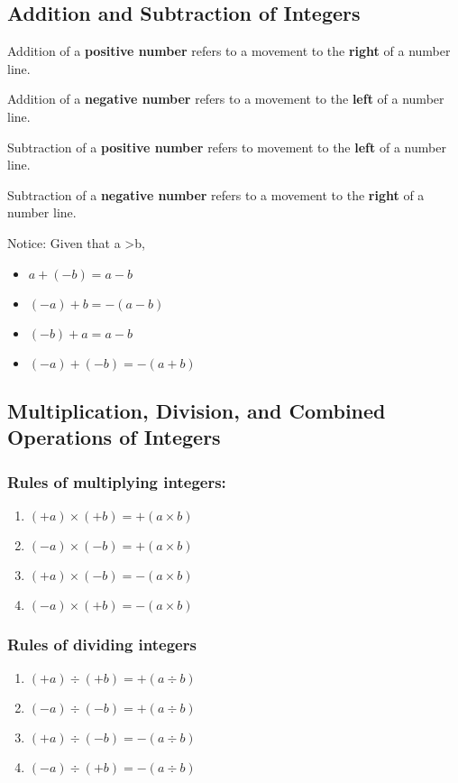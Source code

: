 \documentclass[../main]{subfiles}
\begin{document}
\subsection{Addition and Subtraction of Integers}

Addition of a \textbf{positive number} refers to a movement to the \textbf{right} of a
number line.

Addition of a \textbf{negative number} refers to a movement to the \textbf{left}
of a number line.

Subtraction of a \textbf{positive number} refers to movement to the
\textbf{left} of a number line.

Subtraction of a \textbf{negative number} refers to a movement to the
\textbf{right} of a number line.

Notice: Given that a \textgreater b,
\begin{itemize}
\item \(a + (-b) = a - b \)
\item \((-a) +b = -(a - b)\)
\item \((-b)+ a = a -b\)
\item \((-a)+(-b)= -(a+b)\)
\end{itemize}

\subsection{Multiplication, Division, and Combined Operations of Integers}
\subsubsection{Rules of multiplying integers:}
\begin{enumerate}
\item \((+a) \times (+b) = +(a \times b)\)  
\item \((-a) \times (-b) = +(a \times b)\) 
\item \((+a) \times (-b) = -(a \times b)\)
\item \((-a) \times (+b) = -(a \times b) \)

\end{enumerate}


\subsubsection{Rules of dividing integers}
\begin{enumerate}
\item \((+a) \div (+b) = + ( a \div b)\)
\item \((-a) \div (-b) = +(a \div b)\)
\item \((+a) \div (-b) = - (a \div b)\)
\item \((-a) \div (+b) = -(a \div b)\)
\end{enumerate}
\end{document}
